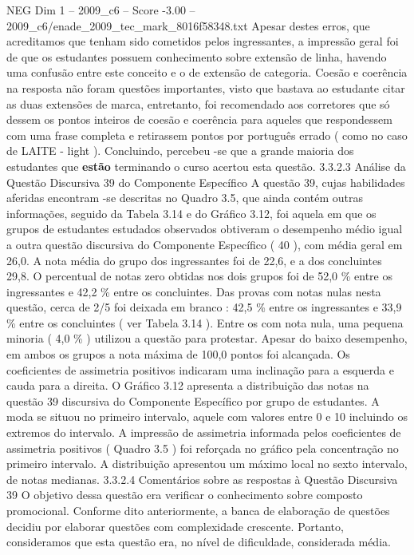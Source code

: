 \begin{textsample}{NEG Dim 1 – 2009\_c6 – Score -3.00 – 2009\_c6/enade\_2009\_tec\_mark\_8016f58348.txt}
Apesar destes erros, que acreditamos que tenham sido cometidos pelos ingressantes, a impressão geral foi de que os estudantes possuem conhecimento sobre extensão de linha, havendo uma confusão entre este conceito e o de extensão de categoria.
Coesão e coerência na resposta não foram questões importantes, visto que bastava ao estudante citar as duas extensões de marca, entretanto, foi recomendado aos corretores que só dessem os pontos inteiros de coesão e coerência para aqueles que respondessem com uma frase completa e retirassem pontos por português errado ( como no caso de LAITE - light ).
Concluindo, percebeu -se que a grande maioria dos estudantes que \textbf{estão} terminando o curso acertou esta questão. 3.3.2.3 Análise da Questão Discursiva 39 do Componente Específico A questão 39, cujas habilidades aferidas encontram -se descritas no Quadro 3.5, que ainda contém outras informações, seguido da Tabela 3.14 e do Gráfico 3.12, foi aquela em que os grupos de estudantes estudados observados obtiveram o desempenho médio igual a outra questão discursiva do Componente Específico ( 40 ), com média geral em 26,0.
A nota média do grupo dos ingressantes foi de 22,6, e a dos concluintes 29,8.
O percentual de notas zero obtidas nos dois grupos foi de 52,0 \% entre os ingressantes e 42,2 \% entre os concluintes.
Das provas com notas nulas nesta questão, cerca de 2/5 foi deixada em branco : 42,5 \% entre os ingressantes e 33,9 \% entre os concluintes ( ver Tabela 3.14 ).
Entre os com nota nula, uma pequena minoria ( 4,0 \% ) utilizou a questão para protestar.
Apesar do baixo desempenho, em ambos os grupos a nota máxima de 100,0 pontos foi alcançada.
Os coeficientes de assimetria positivos indicaram uma inclinação para a esquerda e cauda para a direita.
O Gráfico 3.12 apresenta a distribuição das notas na questão 39 discursiva do Componente Específico por grupo de estudantes.
A moda se situou no primeiro intervalo, aquele com valores entre 0 e 10 incluindo os extremos do intervalo.
A impressão de assimetria informada pelos coeficientes de assimetria positivos ( Quadro 3.5 ) foi reforçada no gráfico pela concentração no primeiro intervalo.
A distribuição apresentou um máximo local no sexto intervalo, de notas medianas. 3.3.2.4 Comentários sobre as respostas à Questão Discursiva 39 O objetivo dessa questão era verificar o conhecimento sobre composto promocional.
Conforme dito anteriormente, a banca de elaboração de questões decidiu por elaborar questões com complexidade crescente.
Portanto, consideramos que esta questão era, no nível de dificuldade, considerada média.

\end{textsample}
